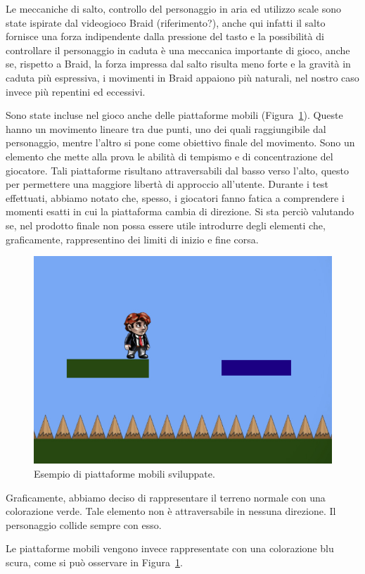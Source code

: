 Le meccaniche di salto, controllo del personaggio in aria ed utilizzo scale sono state ispirate dal videogioco Braid (riferimento?), anche qui infatti il salto fornisce una forza indipendente dalla pressione del tasto e la possibilità di controllare il personaggio in caduta è una meccanica importante di gioco, anche se, rispetto a Braid, la forza impressa dal salto risulta meno forte e la gravità in caduta più espressiva, i movimenti in Braid appaiono più naturali, nel nostro caso invece più repentini ed eccessivi.

Sono state incluse nel gioco anche delle piattaforme mobili (Figura~\ref{fig:platform_piattaforme_mobili}). Queste hanno un movimento lineare tra due punti, uno dei quali raggiungibile dal personaggio, mentre l’altro si pone come obiettivo finale del movimento. Sono un elemento che mette alla prova le abilità di tempismo e di concentrazione del giocatore. Tali piattaforme risultano attraversabili dal basso verso l’alto, questo per permettere una maggiore libertà di approccio all’utente.
Durante i test effettuati, abbiamo notato che, spesso, i giocatori fanno fatica a comprendere i momenti esatti in cui la piattaforma cambia di direzione. Si sta perciò valutando se, nel prodotto finale non possa essere utile introdurre degli elementi che, graficamente, rappresentino dei limiti di inizio e fine corsa.

\begin{figure}%
	\centering
	\includegraphics[width= 0.6\columnwidth]{images/gameDesign/07.jpg}
	\caption{Esempio di piattaforme mobili sviluppate.}
	\label{fig:platform_piattaforme_mobili}
\end{figure}

Graficamente, abbiamo deciso di rappresentare il terreno normale con una colorazione verde. Tale elemento non è attraversabile in nessuna direzione. Il personaggio collide sempre con esso.

Le piattaforme mobili vengono invece rappresentate con una colorazione blu scura, come si può osservare in Figura~\ref{fig:platform_piattaforme_mobili}.

